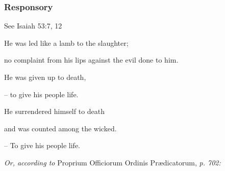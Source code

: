 \subsubsection{Responsory}
\hfill See Isaiah 53:7, 12

\noindent He was led like a lamb to the slaughter;\par
\noindent no complaint from his lips against the evil done to him.\par
\noindent He was given up to death,\par
\noindent – to give his people life.\par
\vspace{5pt}
\noindent He surrendered himself to death\par
\noindent and was counted among the wicked.\par
\noindent – To give his people life.

\vspace{5pt}
\textit{Or, according to} Proprium Officiorum Ordinis Prædicatorum, \textit{p. 702:}
